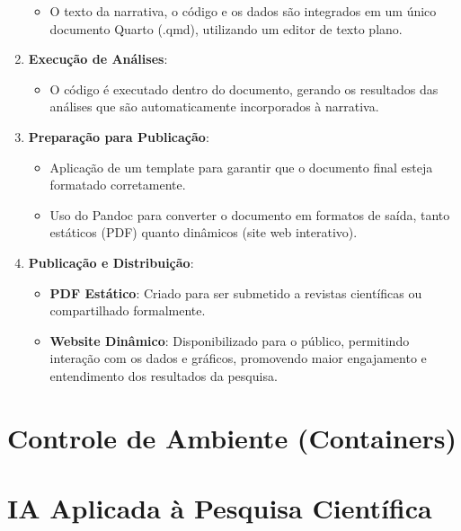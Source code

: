 \documentclass[
  a4paper,
]{article}
\providecommand{\tightlist}{%
  \setlength{\itemsep}{0pt}\setlength{\parskip}{0pt}}\usepackage{longtable,booktabs,array}
\begin{document}
\begin{tcolorbox}
\begin{enumerate}
  \begin{itemize}
  \tightlist
  \item
    O texto da narrativa, o código e os dados são integrados em um único
    documento Quarto (.qmd), utilizando um editor de texto plano.
  \end{itemize}
\item
  \textbf{Execução de Análises}:

  \begin{itemize}
  \tightlist
  \item
    O código é executado dentro do documento, gerando os resultados das
    análises que são automaticamente incorporados à narrativa.
  \end{itemize}
\item
  \textbf{Preparação para Publicação}:

  \begin{itemize}
  \tightlist
  \item
    Aplicação de um template para garantir que o documento final esteja
    formatado corretamente.
  \item
    Uso do Pandoc para converter o documento em formatos de saída, tanto
    estáticos (PDF) quanto dinâmicos (site web interativo).
  \end{itemize}
\item
  \textbf{Publicação e Distribuição}:

  \begin{itemize}
  \tightlist
  \item
    \textbf{PDF Estático}: Criado para ser submetido a revistas
    científicas ou compartilhado formalmente.
  \item
    \textbf{Website Dinâmico}: Disponibilizado para o público,
    permitindo interação com os dados e gráficos, promovendo maior
    engajamento e entendimento dos resultados da pesquisa.
  \end{itemize}
\end{enumerate}

\end{tcolorbox}


\section{Controle de Ambiente (Containers)}\label{sec-docker}


\section{IA Aplicada à Pesquisa Científica}\label{sec-AI}
\end{document}
